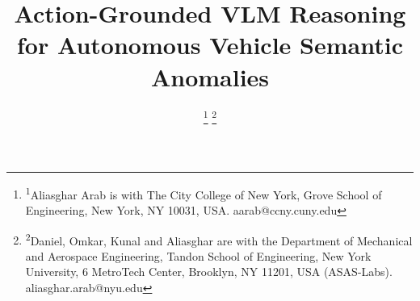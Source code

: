 \documentclass[conference]{IEEEtran}
\begin{document}
\title{Action-Grounded VLM Reasoning for Autonomous Vehicle Semantic Anomalies\\
}

\author{%
\thanks{\textsuperscript{1}Aliasghar Arab is with The City College of New York, Grove School of Engineering, New York, NY 10031, USA. aarab@ccny.cuny.edu}%
\thanks{\textsuperscript{2}Daniel, Omkar, Kunal and Aliasghar are with the Department of Mechanical and Aerospace Engineering, Tandon School of Engineering, New York University, 6 MetroTech Center, Brooklyn, NY 11201, USA (ASAS-Labs). aliasghar.arab@nyu.edu}%
}

\maketitle
\end{document}
